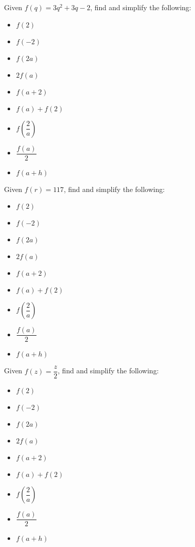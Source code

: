 \documentclass{ximera}
\begin{document}
\begin{problem}
Given $f(q) = 3q^2+3q-2$,
find and simplify the following:

\begin{itemize}

\item  $f(2)$
\item  $f(-2)$
\item  $f(2a)$

\item  $2 f(a)$
\item $f(a+2)$
\item $f(a) + f(2)$

\item  $f \left( \dfrac{2}{a} \right)$
\item $\dfrac{f(a)}{2}$
\item  $f(a + h)$

\end{itemize}
\end{problem}




\begin{problem}
Given $f(r) = 117$,
find and simplify the following:

\begin{itemize}

\item  $f(2)$
\item  $f(-2)$
\item  $f(2a)$

\item  $2 f(a)$
\item $f(a+2)$
\item $f(a) + f(2)$

\item  $f \left( \dfrac{2}{a} \right)$
\item $\dfrac{f(a)}{2}$
\item  $f(a + h)$

\end{itemize}
\end{problem}
  

\begin{problem}\label{secondfuncnotationbasiclast}
Given $f(z) = \dfrac{z}{2}$,
find and simplify the following:

\begin{itemize}

\item  $f(2)$
\item  $f(-2)$
\item  $f(2a)$

\item  $2 f(a)$
\item $f(a+2)$
\item $f(a) + f(2)$

\item  $f \left( \dfrac{2}{a} \right)$
\item $\dfrac{f(a)}{2}$
\item  $f(a + h)$

\end{itemize}
\end{problem}
\end{document}
